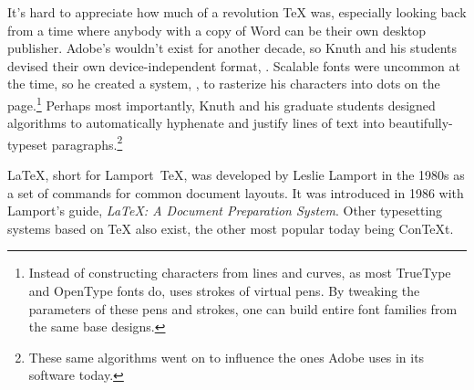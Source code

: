 It's hard to appreciate how much of a revolution \TeX{} was,
especially looking back from a time where anybody with a copy
of Word can be their own desktop publisher.
Adobe's  wouldn't exist for another decade, so Knuth
and his students devised their own device-independent format, .
Scalable fonts were uncommon at the time, so he created a system,
\MF, to rasterize his characters into dots on the
page.\punckern\footnote{%
Instead of constructing characters from lines and curves,
as most TrueType and OpenType fonts do,
\MF{} uses strokes of virtual pens.
By tweaking the parameters of these pens and strokes, one can build entire
font families from the same base designs.}
Perhaps most importantly, Knuth and his graduate students designed algorithms
to automatically hyphenate and justify lines of text into
beautifully-typeset paragraphs.\punckern\footnote{These same algorithms went
on to influence the ones Adobe uses in its software today.\punckern{}}

\LaTeX{}, short for Lamport~\TeX{}, was developed by Leslie Lamport in the 1980s
as a set of commands for common document layouts.
It was introduced in 1986 with Lamport's guide,
\textit{\LaTeX: A Document Preparation System}.
Other typesetting systems based on \TeX{} also exist,
the other most popular today being Con\TeX{}t.

